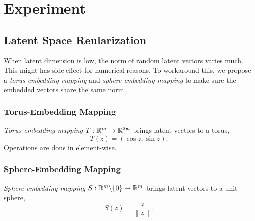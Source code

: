 \section{Experiment}\label{sec:exp}

\subsection{Latent Space Reularization}

When latent dimension is low,
the norm of random latent vectors varies much.
This might has side effect for numerical reasons.
To workaround this,
we propose a \emph{torus-embedding mapping} and \emph{sphere-embedding mapping}
to make sure the embedded vectors share the same norm.

\subsubsection{Torus-Embedding Mapping}

\emph{Torus-embedding mapping} \(T:{\mathbb{R}}^m\to{\mathbb{R}}^{2m}\) brings latent vectors to a torus,
\begin{equation}
    T(z) = (\cos z, \sin z).
\end{equation}
Operations are done in element-wise.

\subsubsection{Sphere-Embedding Mapping}

\emph{Sphere-embedding mapping} \(S:{\mathbb{R}}^m\backslash\{0\}\to{\mathbb{R}}^{m}\) brings latent vectors to a unit sphere,
\begin{equation}
    S(z) = \frac{z}{\|z\|}.
\end{equation}
